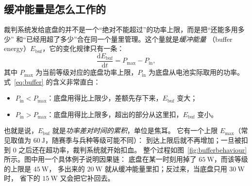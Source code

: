\documentclass[cn,blue,11pt,device=normal]{elegantnote}
\newcommand{\Pin}{P_{\mathrm{in}}{}}
\newcommand{\Ebuf}{E_{\mathrm{buf}}{}}
\newcommand{\Pmax}{P_{\max}{}}
\newcommand{\dd}{\mathrm{d}}
\newcommand{\fref}[1]{式~\eqref{#1}}
\begin{document}
\subsection{缓冲能量是怎么工作的}

裁判系统发给底盘的并不是一个“绝对不能超过”的功率上限，而是把“还能多用多少”
和“已经用超了多少”合在同一个量里管理。这个量就是\emph{缓冲能量}
（buffer energy）$\Ebuf$，它的变化规律只有一条：
\begin{equation}\label{eq:buffer}
  \frac{\dd \Ebuf}{\dd t} = \Pmax - \Pin ,
\end{equation}
其中 $\Pmax$ 为当前等级对应的底盘功率上限，$\Pin$ 为底盘从电池实际取用的功率。
\fref{eq:buffer} 的含义非常直白：

\begin{itemize}
  \item $\Pin < \Pmax$：底盘用得比上限少，差额先存下来，$\Ebuf$ 变大；
  \item $\Pin > \Pmax$：底盘用得比上限多，超出的部分从这里扣，$\Ebuf$ 变小。
\end{itemize}

也就是说，$\Ebuf$ 就是\emph{功率差对时间的累积}，单位是焦耳。
它有一个上限 $E_{\max}$（常见取值为 $60\ \mathrm{J}$，随赛季与兵种等级可能不同）：
到达上限后就不再增加；一旦被扣到 $0$ 之后还在超功率，裁判系统就开始扣血\cite{rm2024rules}。
整个过程如图~\ref{fig:bufferbehaviour} 所示。图中用一个具体例子说明因果链：
底盘在某一时刻用掉了 $65\ \mathrm{W}$，而该等级的上限是 $45\ \mathrm{W}$，
多出来的 $20\ \mathrm{W}$ 就从缓冲能量里扣；反过来，当底盘只用 $30\ \mathrm{W}$ 时，
省下的 $15\ \mathrm{W}$ 又会把它补回去。
\end{document}
